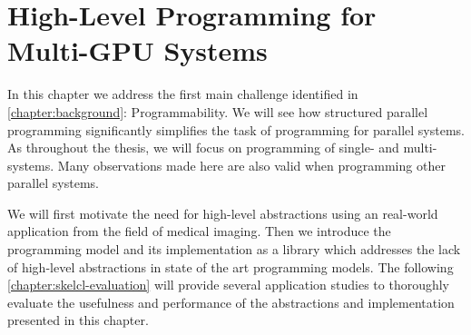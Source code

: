 
\chapter{High-Level Programming for Multi-GPU Systems}

\label{chapter:skelcl}

In this chapter we address the first main challenge identified in \autoref{chapter:background}: Programmability.
We will see how structured parallel programming significantly simplifies the task of programming for parallel systems.
As throughout the thesis, we will focus on programming of single- and multi-\GPU systems.
Many observations made here are also valid when programming other parallel systems.

We will first motivate the need for high-level abstractions using an real-world \OpenCL application from the field of medical imaging.
Then we introduce the \emph{\SkelCL} programming model and its implementation as a \Cpp library which addresses the lack of high-level abstractions in state of the art \GPU programming models.
The following \autoref{chapter:skelcl-evaluation} will provide several application studies to thoroughly evaluate the usefulness and performance of the abstractions and implementation presented in this chapter.
































































